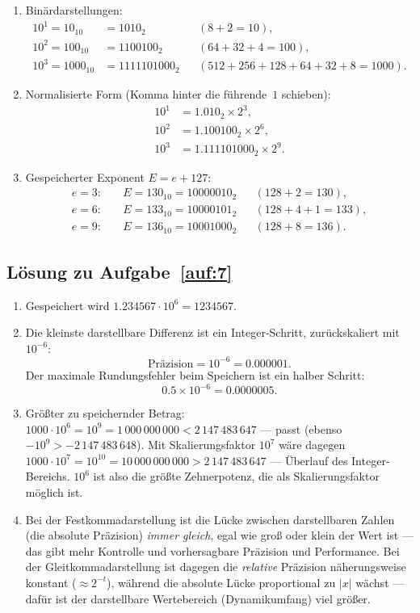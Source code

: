 \documentclass[a4paper,11pt]{scrartcl}
\begin{document}
\begin{enumerate}[label=(\alph*)]
  \item Binärdarstellungen:
  \begin{align*}
  10^1 = 10_{10} &= 1010_2 && (8 + 2 = 10),\\
  10^2 = 100_{10} &= 1100100_2 && (64 + 32 + 4 = 100),\\
  10^3 = 1000_{10} &= 1111101000_2 && (512 + 256 + 128 + 64 + 32 + 8 = 1000).
  \end{align*}
  \item Normalisierte Form (Komma hinter die führende~$1$ schieben):
  \begin{align*}
  10^1 &= 1.010_2 \times 2^3,\\
  10^2 &= 1.100100_2 \times 2^6,\\
  10^3 &= 1.111101000_2 \times 2^9.
  \end{align*}
  \item Gespeicherter Exponent $E = e + 127$:
  \begin{align*}
  e = 3:&\quad E = 130_{10} = 10000010_2 && (128 + 2 = 130),\\
  e = 6:&\quad E = 133_{10} = 10000101_2 && (128 + 4 + 1 = 133),\\
  e = 9:&\quad E = 136_{10} = 10001000_2 && (128 + 8 = 136).
  \end{align*}
\end{enumerate}

\subsection*{Lösung zu Aufgabe~\ref{auf:7}}

\begin{enumerate}[label=(\alph*)]
  \item Gespeichert wird $1.234567 \cdot 10^6 = 1234567$.
  \item Die kleinste darstellbare Differenz ist ein Integer-Schritt, zurückskaliert mit $10^{-6}$:
  \[
  \text{Präzision} = 10^{-6} = 0.000001.
  \]
  Der maximale Rundungsfehler beim Speichern ist ein halber Schritt:
  \[
  0.5 \times 10^{-6} = 0.0000005.
  \]
  \item Größter zu speichernder Betrag: $1000 \cdot 10^6 = 10^9 = 1\,000\,000\,000 < 2\,147\,483\,647$ --- passt (ebenso $-10^9 > -2\,147\,483\,648$). Mit Skalierungsfaktor $10^7$ wäre dagegen $1000 \cdot 10^7 = 10^{10} = 10\,000\,000\,000 > 2\,147\,483\,647$ --- Überlauf des Integer-Bereichs. $10^6$ ist also die größte Zehnerpotenz, die als Skalierungsfaktor möglich ist.
  \item Bei der Festkommadarstellung ist die Lücke zwischen darstellbaren Zahlen (die absolute Präzision) \emph{immer gleich}, egal wie groß oder klein der Wert ist --- das gibt mehr Kontrolle und vorhersagbare Präzision und Performance. Bei der Gleitkommadarstellung ist dagegen die \emph{relative} Präzision näherungsweise konstant ($\approx 2^{-t}$), während die absolute Lücke proportional zu $|x|$ wächst --- dafür ist der darstellbare Wertebereich (Dynamikumfang) viel größer.
\end{enumerate}
\end{document}
